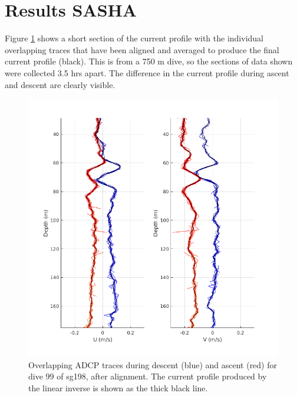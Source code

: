 \section{Results \textbf{SASHA}}

Figure \ref{fig.snippet} shows a short section of the current profile with the individual overlapping traces that have been aligned and averaged to produce the final current profile (black).  This is from a 750 m dive, so the sections of data shown were collected 3.5 hrs apart. The difference in the current profile during ascent and descent are clearly visible.

\begin{figure}%
  \includegraphics[width=\columnwidth]{./figs/freeprofile_zoom_dv116.png}
  \caption{Overlapping ADCP traces during descent (blue) and ascent (red) for
    dive 99 of sg198, after alignment. The current profile produced by the linear inverse is shown as the thick black line.}
  \label{fig.snippet}
\end{figure}


